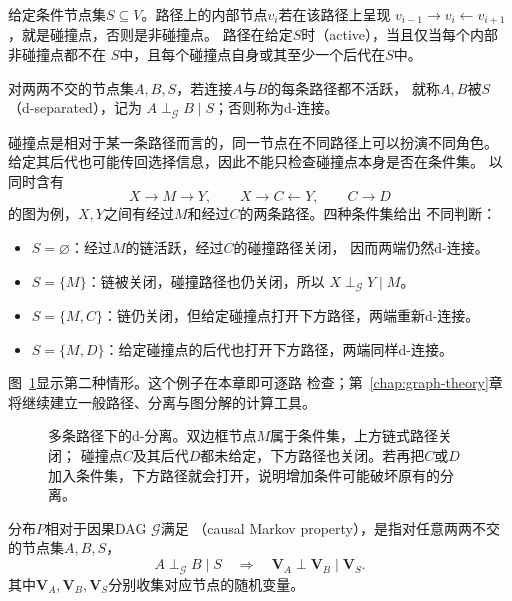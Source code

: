 \begin{definition}[活跃路径与d-分离]
  \label{def:causal-d-separation}
  给定条件节点集\(S\subseteq V\)。路径上的内部节点\(v_i\)若在该路径上呈现
  \(v_{i-1}\to v_i\leftarrow v_{i+1}\)，就是碰撞点，否则是非碰撞点。
  路径在给定\(S\)时（active），当且仅当每个内部非碰撞点都不在
  \(S\)中，且每个碰撞点自身或其至少一个后代在\(S\)中。

  对两两不交的节点集\(A,B,S\)，若连接\(A\)与\(B\)的每条路径都不活跃，
  就称\(A,B\)被\(S\)（d-separated），记为
  \(A\perp_{\mathcal G}B\mid S\)；否则称为d-连接。
\end{definition}

碰撞点是相对于某一条路径而言的，同一节点在不同路径上可以扮演不同角色。
给定其后代也可能传回选择信息，因此不能只检查碰撞点本身是否在条件集。
以同时含有
\[
  X\to M\to Y,\qquad X\to C\leftarrow Y,\qquad C\to D
\]
的图为例，\(X,Y\)之间有经过\(M\)和经过\(C\)的两条路径。四种条件集给出
不同判断：
\begin{itemize}
  \item \(S=\varnothing\)：经过\(M\)的链活跃，经过\(C\)的碰撞路径关闭，
  因而两端仍然d-连接。
  \item \(S=\{M\}\)：链被关闭，碰撞路径也仍关闭，所以
  \(X\perp_{\mathcal G}Y\mid M\)。
  \item \(S=\{M,C\}\)：链仍关闭，但给定碰撞点打开下方路径，两端重新d-连接。
  \item \(S=\{M,D\}\)：给定碰撞点的后代也打开下方路径，两端同样d-连接。
\end{itemize}
图~\ref{fig:causal-d-separation-paths}显示第二种情形。这个例子在本章即可逐路
检查；第~\ref{chap:graph-theory}章将继续建立一般路径、分离与图分解的计算工具。
\begin{figure}[htbp]
  \centering
  
  \caption{多条路径下的d-分离。双边框节点\(M\)属于条件集，上方链式路径关闭；
  碰撞点\(C\)及其后代\(D\)都未给定，下方路径也关闭。若再把\(C\)或\(D\)
  加入条件集，下方路径就会打开，说明增加条件可能破坏原有的分离。}
  \label{fig:causal-d-separation-paths}
\end{figure}
\FloatBarrier

\begin{definition}[因果Markov性]
  \label{def:causal-markov-property}
  分布\(P\)相对于因果DAG \(\mathcal G\)满足
  （causal Markov property），是指对任意两两不交的节点集\(A,B,S\)，
  \[
    A\perp_{\mathcal G}B\mid S
    \quad\Longrightarrow\quad
    \bm V_A\perp\bm V_B\mid\bm V_S.
  \]
  其中\(\bm V_A,\bm V_B,\bm V_S\)分别收集对应节点的随机变量。
\end{definition}

